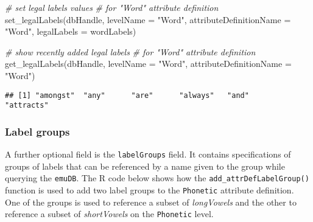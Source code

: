 \documentclass[
]{book}
\newenvironment{Shaded}{\begin{snugshade}}{\end{snugshade}}
\newcommand{\AttributeTok}[1]{\textcolor[rgb]{0.77,0.63,0.00}{#1}}
\newcommand{\CommentTok}[1]{\textcolor[rgb]{0.56,0.35,0.01}{\textit{#1}}}
\newcommand{\FunctionTok}[1]{\textcolor[rgb]{0.00,0.00,0.00}{#1}}
\newcommand{\NormalTok}[1]{#1}
\newcommand{\StringTok}[1]{\textcolor[rgb]{0.31,0.60,0.02}{#1}}
\begin{document}
\begin{Shaded}
\begin{Highlighting}[]
\CommentTok{\# set legal labels values}
\CommentTok{\# for "Word" attribute definition}
\FunctionTok{set\_legalLabels}\NormalTok{(dbHandle,}
                \AttributeTok{levelName =} \StringTok{"Word"}\NormalTok{,}
                \AttributeTok{attributeDefinitionName =} \StringTok{"Word"}\NormalTok{,}
                \AttributeTok{legalLabels =}\NormalTok{ wordLabels)}

\CommentTok{\# show recently added legal labels}
\CommentTok{\# for "Word" attribute definition}
\FunctionTok{get\_legalLabels}\NormalTok{(dbHandle,}
                \AttributeTok{levelName =} \StringTok{"Word"}\NormalTok{,}
                \AttributeTok{attributeDefinitionName =} \StringTok{"Word"}\NormalTok{)}
\end{Highlighting}
\end{Shaded}

\begin{verbatim}
## [1] "amongst"  "any"      "are"      "always"   "and"      "attracts"
\end{verbatim}

\hypertarget{label-groups}{%
\subsubsection{Label groups}\label{label-groups}}

A further optional field is the \texttt{labelGroups} field. It contains specifications of groups of labels that can be referenced by a name given to the group while querying the \texttt{emuDB}. The R code below shows how the \texttt{add\_attrDefLabelGroup()} function is used to add two label groups to the \texttt{Phonetic} attribute definition. One of the groups is used to reference a subset of \emph{longVowels} and the other to reference a subset of \emph{shortVowels} on the \texttt{Phonetic} level.
\end{document}
